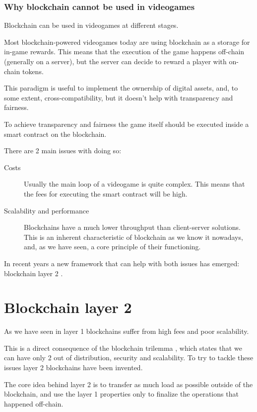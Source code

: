 \documentclass[11pt]{article}
\begin{document}
\section{Why blockchain cannot be used in videogames} \label{section:wbcnbuiv}
Blockchain can be used in videogames at different stages.

Most blockchain-powered videogames today are using blockchain as a storage for in-game rewards. This means that the execution of the game happens off-chain (generally on a server), but the server can decide to reward a player with on-chain tokens.

This paradigm is useful to implement the ownership of digital assets, and, to some extent, cross-compatibility, but it doesn't help with transparency and fairness.

To achieve transparency and fairness the game itself should be executed inside a smart contract on the blockchain.

There are 2 main issues with doing so:
\begin{description}
    \item[Costs] Usually the main loop of a videogame is quite complex. This means that the fees for executing the smart contract will be high.
    \item[Scalability and performance] Blockchains have a much lower throughput than client-server solutions. This is an inherent characteristic of blockchain as we know it nowadays, and, as we have seen, a core principle of their functioning.
\end{description}

In recent years a new framework that can help with both issues has emerged: blockchain layer 2 \cite{ethereum_scaling}.

\newpage
\part{Blockchain layer 2} \label{part:bl2}
As we have seen in  layer 1 blockchains suffer from high fees and poor scalability.

This is a direct consequence of the blockchain trilemma \cite{blockchain_trilemma}, which states that we can have only 2 out of distribution, security and scalability.
To try to tackle these issues layer 2 blockchains have been invented.

The core idea behind layer 2 is to transfer as much load as possible outside of the blockchain, and use the layer 1 properties only to finalize the operations that happened off-chain.
\end{document}
